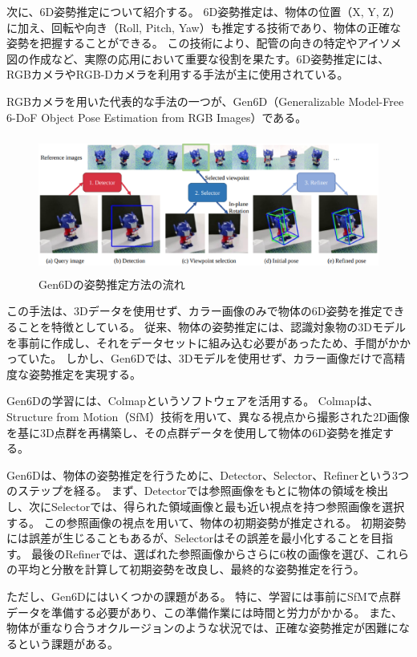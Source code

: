 次に、6D姿勢推定について紹介する。
6D姿勢推定は、物体の位置（X, Y, Z）に加え、回転や向き（Roll, Pitch, Yaw）も推定する技術であり、物体の正確な姿勢を把握することができる。
この技術により、配管の向きの特定やアイソメ図の作成など、実際の応用において重要な役割を果たす。6D姿勢推定には、RGBカメラやRGB-Dカメラを利用する手法が主に使用されている。

RGBカメラを用いた代表的な手法の一つが、Gen6D（Generalizable Model-Free 6-DoF Object Pose Estimation from RGB Images）である。
\begin{figure}[htbt]
	\centering
	 \includegraphics[height=45mm]{Figure/Gen6D.eps}
	 \caption{Gen6Dの姿勢推定方法の流れ}
	 \label{fig:f6}
\end{figure}

この手法は、3Dデータを使用せず、カラー画像のみで物体の6D姿勢を推定できることを特徴としている。
従来、物体の姿勢推定には、認識対象物の3Dモデルを事前に作成し、それをデータセットに組み込む必要があったため、手間がかかっていた。
しかし、Gen6Dでは、3Dモデルを使用せず、カラー画像だけで高精度な姿勢推定を実現する。

Gen6Dの学習には、Colmapというソフトウェアを活用する。
Colmapは、Structure from Motion（SfM）技術を用いて、異なる視点から撮影された2D画像を基に3D点群を再構築し、その点群データを使用して物体の6D姿勢を推定する。

Gen6Dは、物体の姿勢推定を行うために、Detector、Selector、Refinerという3つのステップを経る。
まず、Detectorでは参照画像をもとに物体の領域を検出し、次にSelectorでは、得られた領域画像と最も近い視点を持つ参照画像を選択する。
この参照画像の視点を用いて、物体の初期姿勢が推定される。
初期姿勢には誤差が生じることもあるが、Selectorはその誤差を最小化することを目指す。
最後のRefinerでは、選ばれた参照画像からさらに6枚の画像を選び、これらの平均と分散を計算して初期姿勢を改良し、最終的な姿勢推定を行う。

ただし、Gen6Dにはいくつかの課題がある。
特に、学習には事前にSfMで点群データを準備する必要があり、この準備作業には時間と労力がかかる。
また、物体が重なり合うオクルージョンのような状況では、正確な姿勢推定が困難になるという課題がある。

